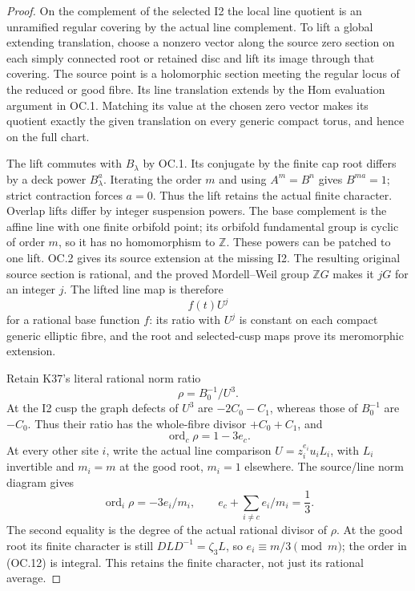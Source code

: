 \begin{proof}
\par\nobreak

On the complement of the selected I2 the local line quotient is an
unramified regular covering by the actual line complement. To lift
a global extending translation, choose a nonzero vector along the
source zero section on each simply connected root or retained disc
and lift its image through that covering. The source point is a
holomorphic section meeting the regular locus of the reduced or
good fibre. Its line translation extends by the Hom evaluation
argument in OC.1. Matching its value at the chosen zero vector
makes its quotient exactly the given translation on every generic
compact torus, and hence on the full chart.

The lift commutes with \(B_\lambda\) by OC.1. Its conjugate
by the finite cap root differs by a deck power \(B_\lambda^a\).
Iterating the order \(m\) and using \(A^m=B^n\) gives
\(B^{ma}=1\); strict contraction forces \(a=0\). Thus the
lift retains the actual finite character. Overlap lifts differ by
integer suspension powers. The base complement is the affine line
with one finite orbifold point; its orbifold fundamental group is
cyclic of order \(m\), so it has no homomorphism to \(\mathbb Z\).
These powers can be patched to one lift. OC.2 gives its source
extension at the missing I2. The resulting original source section
is rational, and the proved Mordell--Weil group \(\mathbb ZG\)
makes it \(jG\) for an integer \(j\). The lifted line map is
therefore
\[
                            f(t)U^j                       \tag{OC.9}
\]
for a rational base function \(f\): its ratio with \(U^j\)
is constant on each compact generic elliptic fibre, and the root
and selected-cusp maps prove its meromorphic extension.

Retain K37's literal rational norm ratio
\[
                   \rho=B_0^{-1}/U^3.                    \tag{OC.10}
\]
At the I2 cusp the graph defects of \(U^3\) are
\(-2C_0-C_1\), whereas those of \(B_0^{-1}\) are
\(-C_0\). Thus their ratio has the whole-fibre divisor
\(+C_0+C_1\), and
\[
                  \operatorname{ord}_c\rho=1-3e_c.       \tag{OC.11}
\]
At every other site \(i\), write the actual line comparison
\(U=z_i^{e_i}u_i L_i\), with \(L_i\) invertible and
\(m_i=m\) at the good root, \(m_i=1\) elsewhere. The
source/line norm diagram gives
\[
 \operatorname{ord}_i\rho=-3e_i/m_i,\qquad
             e_c+\sum_{i\ne c}e_i/m_i=\frac13.           \tag{OC.12}
\]
The second equality is the degree of the actual rational divisor
of \(\rho\). At the good root its finite character is still
\(DLD^{-1}=\zeta_3L\), so \(e_i\equiv m/3\pmod m\);
the order in (OC.12) is integral. This retains the finite character,
not just its rational average.


\end{proof}
